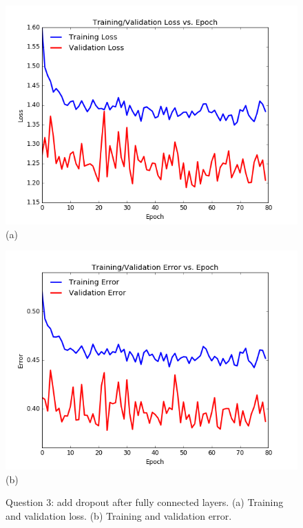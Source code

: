 \documentclass[paper=a4, fontsize=11pt]{scrartcl}
\begin{document}
\begin{figure}
\centering
\centering
 \begin{minipage}{.5\columnwidth}
\centering
  	\includegraphics[width=1\linewidth]{question3_loss.png}
  	\footnotesize{(a)}
 \end{minipage}\hfill%
\centering
 \begin{minipage}{.5\columnwidth}
\centering
  	\includegraphics[width=1\columnwidth]{question3_error.png}
  	\footnotesize{(b)}
 \end{minipage}\hfill%
\caption{Question 3: add dropout after fully connected layers. (a) Training and validation loss. (b) Training and validation error.}
\label{fig:question3}
\end{figure}
\end{document}
